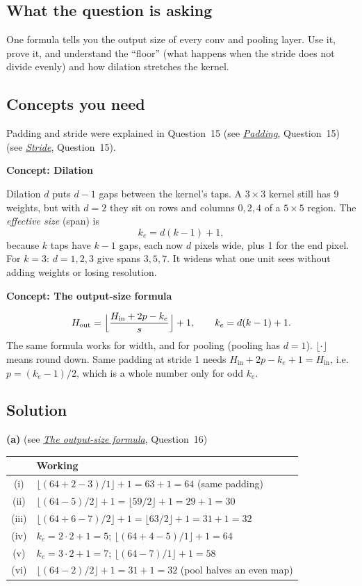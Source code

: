 \documentclass[12pt,a4paper]{article}
\newcommand{\concept}[2]{\par\medskip\phantomsection\label{#1}{\large\bfseries\color{blue!50!black} Concept: #2}\par}
\newcommand{\seeconcept}[3]{(see \hyperref[#1]{\textit{#2}}, Question~#3)}
\begin{document}
\subsection*{What the question is asking}
One formula tells you the output size of every conv and pooling layer. Use it, prove it, and understand the ``floor'' (what happens when the stride does not divide evenly) and how dilation stretches the kernel.

\subsection*{Concepts you need}
Padding and stride were explained in Question~15 \seeconcept{c:padding}{Padding}{15} \seeconcept{c:stride}{Stride}{15}.

\concept{c:dilation}{Dilation}
Dilation $d$ puts $d-1$ gaps between the kernel's taps. A $3\times3$ kernel still has 9 weights, but with $d=2$ they sit on rows and columns $0,2,4$ of a $5\times5$ region. The \emph{effective size} (span) is
\[
k_e=d(k-1)+1,
\]
because $k$ taps have $k-1$ gaps, each now $d$ pixels wide, plus 1 for the end pixel. For $k=3$: $d=1,2,3$ give spans $3,5,7$. It widens what one unit sees without adding weights or losing resolution.

\concept{c:outsize}{The output-size formula}
\[
H_{\text{out}}=\Bigl\lfloor\frac{H_{\text{in}}+2p-k_e}{s}\Bigr\rfloor+1,\qquad k_e=d(k-1)+1 .
\]
The same formula works for width, and for pooling (pooling has $d=1$). $\lfloor\cdot\rfloor$ means round down. Same padding at stride 1 needs $H_{\text{in}}+2p-k_e+1=H_{\text{in}}$, i.e.\ $p=(k_e-1)/2$, which is a whole number only for odd $k_e$.

\subsection*{Solution}
\textbf{(a)} \seeconcept{c:outsize}{The output-size formula}{16}
\begin{center}
\begin{tabular}{@{}cl@{}}
\toprule
& Working \\
\midrule
(i) & $\lfloor(64+2-3)/1\rfloor+1=63+1=64$ (same padding)\\
(ii) & $\lfloor(64-5)/2\rfloor+1=\lfloor59/2\rfloor+1=29+1=30$\\
(iii) & $\lfloor(64+6-7)/2\rfloor+1=\lfloor63/2\rfloor+1=31+1=32$\\
(iv) & $k_e=2\cdot2+1=5$; $\lfloor(64+4-5)/1\rfloor+1=64$\\
(v) & $k_e=3\cdot2+1=7$; $\lfloor(64-7)/1\rfloor+1=58$\\
(vi) & $\lfloor(64-2)/2\rfloor+1=31+1=32$ (pool halves an even map)\\
\bottomrule
\end{tabular}
\end{center}
\end{document}
